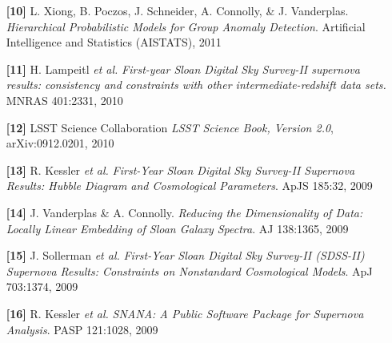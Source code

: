 \documentclass{article} %
\def\bf{\bfseries}
\def\sl{\slshape}
\begin{document}
{\begin{itemize}[leftmargin=0ex, itemsep=0ex, parsep=.5ex, labelindent=-4ex]
    \item[{\bf \textcolor{myblue}{[10]}}]
      L. Xiong, B. Poczos, J. Schneider, A. Connolly, \& J. Vanderplas.
      {\sl Hierarchical Probabilistic Models for Group Anomaly Detection}.
      Artificial Intelligence and Statistics (AISTATS), 2011

    \item[{\bf \textcolor{myblue}{[11]}}]
      H. Lampeitl {\sl et al.}
      {\sl First-year Sloan Digital Sky Survey-II supernova results: 
      consistency and constraints with other intermediate-redshift data sets.}
      MNRAS 401:2331, 2010

    \item[{\bf \textcolor{myblue}{[12]}}]
      LSST Science Collaboration
      {\sl LSST Science Book, Version 2.0}, arXiv:0912.0201, 2010

    \item[{\bf \textcolor{myblue}{[13]}}]
      R. Kessler {\it et al.}
      {\it First-Year Sloan Digital Sky Survey-II Supernova Results: 
      Hubble Diagram and Cosmological Parameters}.
      ApJS 185:32, 2009

    \item[{\bf \textcolor{myblue}{[14]}}]
      J. Vanderplas \& A. Connolly.
      {\it Reducing the Dimensionality of Data: Locally 
      Linear Embedding of Sloan Galaxy Spectra}.
      AJ 138:1365, 2009

    \item[{\bf \textcolor{myblue}{[15]}}]
      J. Sollerman {\sl et al.}
      {\it First-Year Sloan Digital Sky Survey-II (SDSS-II) Supernova 
      Results: Constraints on Nonstandard Cosmological Models}.
      ApJ 703:1374, 2009

    \item[{\bf \textcolor{myblue}{[16]}}]
      R. Kessler {\it et al.}
      {\it SNANA: A Public Software Package for Supernova Analysis}.
      PASP 121:1028, 2009

  \end{itemize}
}
\end{document}
